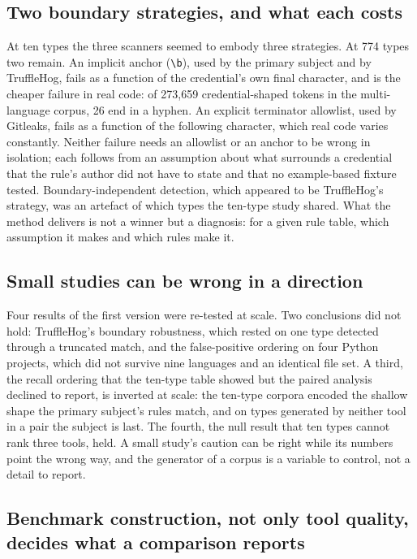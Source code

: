 \documentclass[pdflatex,sn-basic]{sn-jnl}
\begin{document}
\subsection{Two boundary strategies, and what each costs}

At ten types the three scanners seemed to embody three strategies. At 774 types two remain. An implicit anchor (\verb|\b|), used by the primary subject and by TruffleHog, fails as a function of the credential's own final character, and is the cheaper failure in real code: of 273{,}659 credential-shaped tokens in the multi-language corpus, 26 end in a hyphen. An explicit terminator allowlist, used by Gitleaks, fails as a function of the following character, which real code varies constantly. Neither failure needs an allowlist or an anchor to be wrong in isolation; each follows from an assumption about what surrounds a credential that the rule's author did not have to state and that no example-based fixture tested. Boundary-independent detection, which appeared to be TruffleHog's strategy, was an artefact of which types the ten-type study shared. What the method delivers is not a winner but a diagnosis: for a given rule table, which assumption it makes and which rules make it.

\subsection{Small studies can be wrong in a direction}

Four results of the first version were re-tested at scale. Two conclusions did not hold: TruffleHog's boundary robustness, which rested on one type detected through a truncated match, and the false-positive ordering on four Python projects, which did not survive nine languages and an identical file set. A third, the recall ordering that the ten-type table showed but the paired analysis declined to report, is inverted at scale: the ten-type corpora encoded the shallow shape the primary subject's rules match, and on types generated by neither tool in a pair the subject is last. The fourth, the null result that ten types cannot rank three tools, held. A small study's caution can be right while its numbers point the wrong way, and the generator of a corpus is a variable to control, not a detail to report.

\subsection{Benchmark construction, not only tool quality, decides what a comparison reports}
\end{document}
